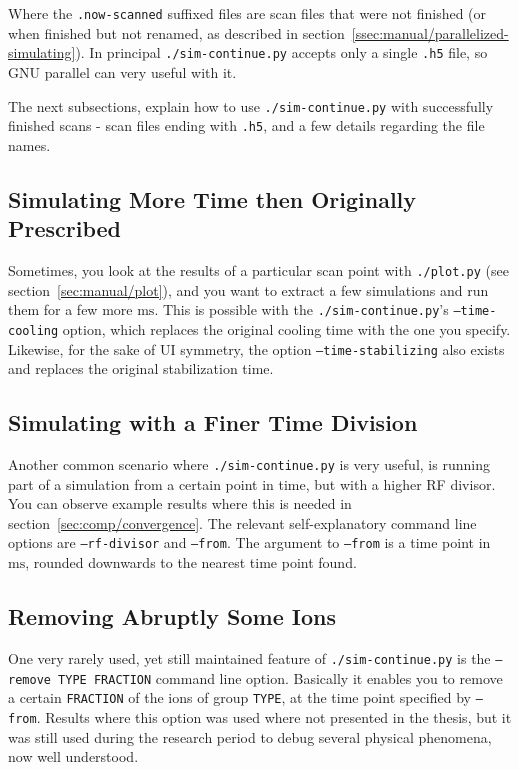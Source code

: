 Where the \texttt{.now-scanned} suffixed files are scan files that were not finished (or when finished but not renamed, as described in section~\ref{ssec:manual/parallelized-simulating}). In principal \texttt{./sim-continue.py} accepts only a single \texttt{.h5} file, so GNU parallel\cite{GNUParallel} can very useful with it.

The next subsections, explain how to use \texttt{./sim-continue.py} with successfully finished scans - scan files ending with \texttt{.h5}, and a few details regarding the file names.

\subsection{Simulating More Time then Originally Prescribed}

Sometimes, you look at the results of a particular scan point with \texttt{./plot.py} (see section~\ref{sec:manual/plot}), and you want to extract a few simulations and run them for a few more $\mathrm{ms}$. This is possible with the \texttt{./sim-continue.py}'s \texttt{--time-cooling} option, which replaces the original cooling time with the one you specify. Likewise, for the sake of UI symmetry, the option \texttt{--time-stabilizing} also exists and replaces the original stabilization time.

\subsection{Simulating with a Finer Time Division}

Another common scenario where \texttt{./sim-continue.py} is very useful, is running part of a simulation from a certain point in time, but with a higher RF divisor. You can observe example results where this is needed in section~\ref{sec:comp/convergence}. The relevant self-explanatory command line options are \texttt{--rf-divisor} and \texttt{--from}. The argument to \texttt{--from} is a time point in $\mathrm{ms}$, rounded downwards to the nearest time point found.

\subsection{Removing Abruptly Some Ions}

One very rarely used, yet still maintained feature of \texttt{./sim-continue.py} is the \texttt{--remove TYPE FRACTION} command line option. Basically it enables you to remove a certain \texttt{FRACTION} of the ions of group \texttt{TYPE}, at the time point specified by \texttt{--from}. Results where this option was used where not presented in the thesis, but it was still used during the research period to debug several physical phenomena, now well understood.

